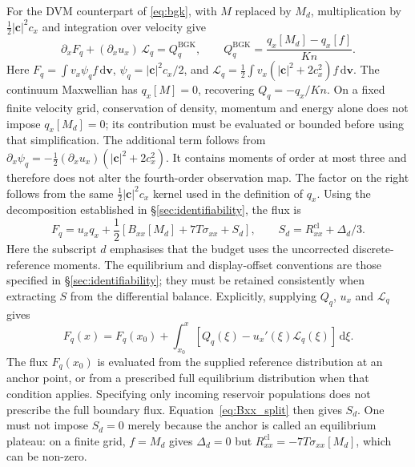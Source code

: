 \documentclass[lineno,paper]{JFM-FLM_Au}
\newenvironment{revision}{\begingroup\colorlet{shadecolor}{revisionyellow}\begin{shaded}}{\end{shaded}\endgroup}
\newenvironment{revision}{}{}
\newcommand{\Kn}{\mathit{Kn}}
\newcommand{\dd}{\mathrm{d}}
\newcommand{\cl}{\mathrm{cl}}
\begin{document}
\begin{revision}
For the DVM counterpart of \eqref{eq:bgk}, with $M$ replaced by $M_d$, multiplication by $\frac12|\boldsymbol c|^2c_x$ and integration over velocity give
\begin{equation}
  \partial_x F_q + (\partial_x u_x)\,\mathcal L_q
  =Q_q^{\mathrm{BGK}},
  \qquad
  Q_q^{\mathrm{BGK}}=\frac{q_x[M_d]-q_x[f]}{\Kn} .
  \label{eq:heatbalance_general}
\end{equation}
Here $F_q=\int v_x\psi_q f\,\dd\boldsymbol v$, $\psi_q=|\boldsymbol c|^2c_x/2$, and $\mathcal L_q=\frac12\int v_x(|\boldsymbol c|^2+2c_x^2)f\,\dd\boldsymbol v$. The continuum Maxwellian has $q_x[M]=0$, recovering $Q_q=-q_x/\Kn$. On a fixed finite velocity grid, conservation of density, momentum and energy alone does not impose $q_x[M_d]=0$; its contribution must be evaluated or bounded before using that simplification. The additional term follows from $\partial_x\psi_q=-\frac12(\partial_xu_x)(|\boldsymbol c|^2+2c_x^2)$. It contains moments of order at most three and therefore does not alter the fourth-order observation map. The factor on the right follows from the same $\frac12|\boldsymbol c|^2c_x$ kernel used in the definition of $q_x$. Using the decomposition established in \S\ref{sec:identifiability}, the flux is
\begin{equation}
  F_q=u_xq_x+\frac12\left[B_{xx}[M_d]+7T\sigma_{xx}+S_d\right],
  \qquad S_d=R^{\cl}_{xx}+\Delta_d/3 .
  \label{eq:Bxx_split}
\end{equation}
Here the subscript $d$ emphasises that the budget uses the uncorrected discrete-reference moments. The equilibrium and display-offset conventions are those specified in \S\ref{sec:identifiability}; they must be retained consistently when extracting $S$ from the differential balance.
Explicitly, supplying $Q_q$, $u_x$ and $\mathcal L_q$ gives
\begin{equation}
 F_q(x)=F_q(x_0)+\int_{x_0}^{x}
 \left[Q_q(\xi)-u_x'(\xi)\mathcal L_q(\xi)\right]\,\dd\xi .
 \label{eq:heat_flux_integrated}
\end{equation}
The flux $F_q(x_0)$ is evaluated from the supplied reference distribution at an anchor point, or from a prescribed full equilibrium distribution when that condition applies. Specifying only incoming reservoir populations does not prescribe the full boundary flux. Equation~\eqref{eq:Bxx_split} then gives $S_d$. One must not impose $S_d=0$ merely because the anchor is called an equilibrium plateau: on a finite grid, $f=M_d$ gives $\Delta_d=0$ but $R^{\cl}_{xx}=-7T\sigma_{xx}[M_d]$, which can be non-zero.

\end{revision}
\end{document}
